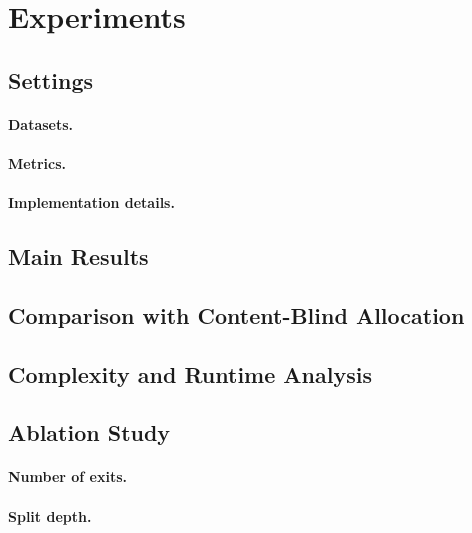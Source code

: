 \section{Experiments}
\label{sec:experiments}

\subsection{Settings}
\label{sec:settings}

\paragraph{Datasets.}

\paragraph{Metrics.}

\paragraph{Implementation details.}

\subsection{Main Results}
\label{sec:main}

\subsection{Comparison with Content-Blind Allocation}
\label{sec:rules}

\subsection{Complexity and Runtime Analysis}
\label{sec:runtime}

\subsection{Ablation Study}
\label{sec:ablations}

\paragraph{Number of exits.}

\paragraph{Split depth.}

